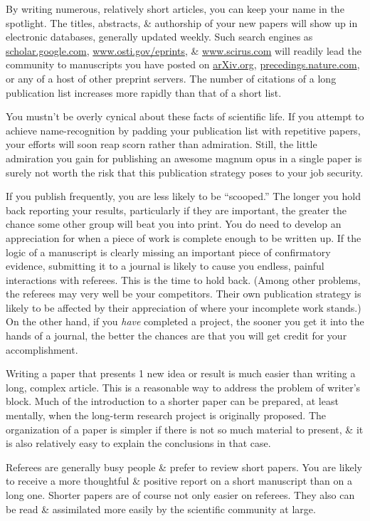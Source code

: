 \documentclass{article}
\numberwithin{equation}{section}
\begin{document}
By writing numerous, relatively short articles, you can keep your name in the spotlight. The titles, abstracts, \& authorship of your new papers will show up in electronic databases, generally updated weekly. Such search engines as \url{scholar.google.com}, \url{www.osti.gov/eprints},
\& \url{www.scirus.com} will readily lead the community to manuscripts you have posted on \url{arXiv.org}, \url{precedings.nature.com}, or any of a host of other preprint servers. The number of citations of a long publication list increases more rapidly than that of a short list.

You mustn't be overly cynical about these facts of scientific life. If you attempt to achieve name-recognition by padding your publication list with repetitive papers, your efforts will soon reap scorn rather than admiration. Still, the little admiration you gain for publishing an awesome magnum opus in a single paper is surely not worth the risk that this publication strategy poses to your job security.

If you publish frequently, you are less likely to be ``scooped.'' The longer you hold back reporting your results, particularly if they are important, the greater the chance some other group will beat you into print. You do need to develop an appreciation for when a piece of work is complete enough to be written up. If the logic of a manuscript is clearly missing an important piece of confirmatory evidence, submitting it to a journal is likely to cause you endless, painful interactions with referees. This is the time to hold back. (Among other problems, the referees may very well be your competitors. Their own publication strategy is likely to be affected by their appreciation of where your incomplete work stands.) On the other hand, if you \textit{have} completed a project, the sooner you get it into the hands of a journal, the better the chances are that you will get credit for your accomplishment.

Writing a paper that presents 1 new idea or result is much easier than writing a long, complex article. This is a reasonable way to address the problem of writer's block. Much of the introduction to a shorter paper can be prepared, at least mentally, when the long-term research project is originally proposed. The organization of a paper is simpler if there is not so much material to present, \& it is also relatively easy to explain the conclusions in that case.

Referees are generally busy people \& prefer to review short papers. You are likely to receive a more thoughtful \& positive report on a short manuscript than on a long one. Shorter papers are of course not only easier on referees. They also can be read \& assimilated more easily by the scientific community at large.
\end{document}
